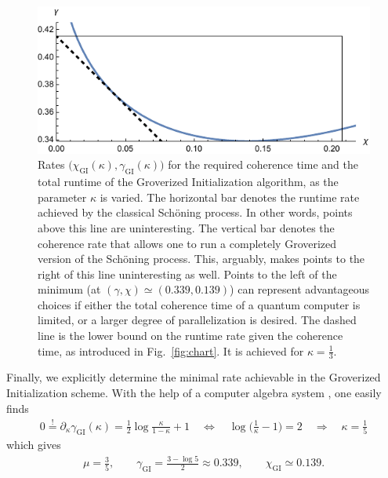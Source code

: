 \documentclass[a4paper,aps,floatfix]{revtex4}
\begin{document}
\begin{figure}[ht]
    \begin{center}
			\includegraphics[scale=.75]{images/gi-tradeoffs-zoom}
    \end{center}
		\caption{\label{fig:gi_tradeoffs} 
			Rates $\big(\chi_{\mathrm{GI}}(\kappa), \gamma_{\mathrm{GI}}(\kappa)\big)$
			for the required coherence time and the total runtime of the Groverized Initialization algorithm, as the parameter $\kappa$ is varied.
			The horizontal bar denotes the runtime rate achieved by the classical Sch\"oning process. 
			In other words, points above this line are uninteresting.
			The vertical bar denotes the coherence rate that allows one to run a completely Groverized version of the Sch\"oning process.
			This, arguably, makes points to the right of this line uninteresting as well.
			Points to the left of the minimum (at $(\gamma,\chi)\simeq (0.339, 0.139)$) can represent advantageous choices if either the total coherence time of a quantum computer is limited, or a larger degree of parallelization is desired.
			The dashed line is the lower bound on the runtime rate given the coherence time, as introduced in Fig.~\ref{fig:chart}.
			It is achieved for $\kappa=\frac13$.
		}
\end{figure}

Finally, we explicitly determine the minimal rate achievable in the Groverized Initialization scheme.
With the help of a computer algebra system \cite{our-data}, one easily finds
\begin{align}\label{partialk}
    0 \stackrel{!}{=} 
		\partial_\kappa \gamma_{\textrm{GI}}(\kappa)=\frac12\log\frac{\kappa}{1-\kappa}+1
		\quad\Leftrightarrow\quad
		\log\Big(\frac1{\kappa}-1\Big) = 2 
		\quad\Rightarrow\quad
		\kappa = \frac15 
\end{align}
which gives
\begin{align}
	\label{eqn:gi_optimal}
	\mu = \frac35, 
	\qquad
	\gamma_{\textrm{GI}} = \frac{3-\log5}{2}\approx 0.339,
	\qquad
	\chi_{\textrm{GI}} \simeq 0.139.
\end{align}
\end{document}
